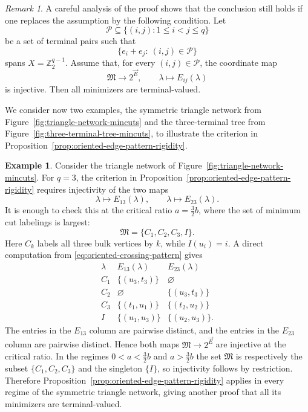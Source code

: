 \documentclass[11pt,oneside,letterpaper]{article}
\numberwithin{equation}{section}
\theoremstyle{definition}
\newtheorem{example}[theorem]{Example}
\theoremstyle{remark}
\newtheorem{remark}[theorem]{Remark}
\begin{document}
\begin{remark}
A careful analysis of the proof shows that the conclusion still holds
if one replaces the assumption by the following
condition.  Let
\begin{equation}
  \mathcal P\subseteq\{(i,j):1\le i<j\le q\}
\end{equation}
be a set of terminal pairs such that
\begin{equation}
  \{e_i+e_j:\ (i,j)\in\mathcal P\}
\end{equation}
spans $X=\mathbb Z_2^{q-1}$.  Assume that, for every
$(i,j)\in\mathcal P$, the coordinate map
\begin{equation}
  \mathfrak{M}\to
  2^{\overrightarrow E},
  \qquad
  \lambda\mapsto E_{ij}(\lambda)
\end{equation}
is injective.  Then all minimizers are terminal-valued.
\end{remark}

We consider now two examples, the symmetric triangle network from Figure~\ref{fig:triangle-network-mincuts} and the three-terminal tree from Figure~\ref{fig:three-terminal-tree-mincuts}, to illustrate the criterion in Proposition~\ref{prop:oriented-edge-pattern-rigidity}.


\begin{example}
Consider the triangle network of Figure~\ref{fig:triangle-network-mincuts}.
For $q=3$, the criterion in
Proposition~\ref{prop:oriented-edge-pattern-rigidity} requires
injectivity of the two maps
\begin{equation}
  \lambda\mapsto E_{13}(\lambda),
  \qquad
  \lambda\mapsto E_{23}(\lambda).
\end{equation}
It is enough to check this at the critical ratio $a=\frac32b$, where
the set of minimum cut labelings is largest:
\begin{equation}
  \mathfrak{M}=\{C_1,C_2,C_3,I\}.
\end{equation}
Here $C_k$ labels all three bulk vertices by $k$, while
$I(u_i)=i$.  A direct computation from
\eqref{eq:oriented-crossing-pattern} gives
\begin{equation}
\begin{array}{c|c|c}
\lambda & E_{13}(\lambda) & E_{23}(\lambda)\\
\hline
C_1 & \{(u_3,t_3)\} & \varnothing\\
C_2 & \varnothing & \{(u_3,t_3)\}\\
C_3 & \{(t_1,u_1)\} & \{(t_2,u_2)\}\\
I   & \{(u_1,u_3)\} & \{(u_2,u_3)\}.
\end{array}
\end{equation}
The entries in the $E_{13}$ column are pairwise distinct, and the
entries in the $E_{23}$ column are pairwise distinct.  Hence both maps
$\mathfrak{M}\to 2^{\overrightarrow E}$ are injective at the critical
ratio.  In the regimes $0<a<\frac32b$ and $a>\frac32b$ the set
$\mathfrak{M}$ is respectively the subset $\{C_1,C_2,C_3\}$ and the
singleton $\{I\}$, so injectivity follows by restriction.  Therefore
Proposition~\ref{prop:oriented-edge-pattern-rigidity} applies in every
regime of the symmetric triangle network, giving another proof that all
its minimizers are terminal-valued.
\end{example}
\end{document}
